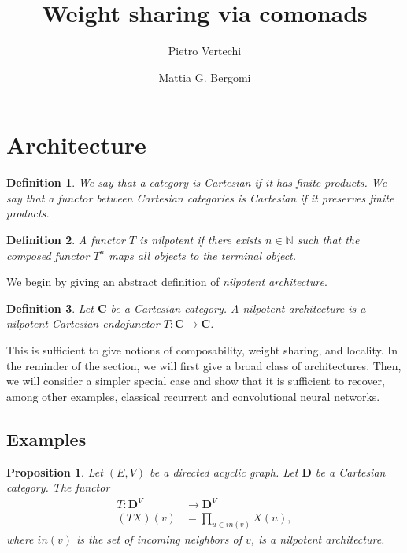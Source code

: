 \documentclass[12pt]{article}
\title{Weight sharing via comonads}
\author{
    Pietro Vertechi \and Mattia G. Bergomi
}
\date{}
\newtheorem{definition}{Definition}
\newtheorem{proposition}{Proposition}
\newcommand{\N}{{\mathbb{N}}}
\newcommand{\Cat}{{\mathbf{C}}}
\newcommand{\DCat}{{\mathbf{D}}}
\begin{document}
\maketitle
\begin{abstract}
\end{abstract}

\section{Architecture}


\begin{definition}\label{def:cartesian_category}
    We say that a category is {\em Cartesian} if it has finite products. We say that a functor between Cartesian categories is Cartesian if it preserves finite products.
\end{definition}

\begin{definition}\label{def:nilpotent_functor}
    A functor $T$ is {\em nilpotent} if there exists $n \in \N$ such that the composed functor $T^n$ maps all objects to the terminal object.
\end{definition}

We begin by giving an abstract definition of {\em nilpotent architecture}.

\begin{definition}\label{def:nilpotent_architecture}
    Let $\Cat$ be a Cartesian category. A {\em nilpotent architecture} is a nilpotent Cartesian endofunctor $T \colon \Cat \rightarrow \Cat$.
\end{definition}

This is sufficient to give notions of composability, weight sharing, and locality. In the reminder of the section, we will first give a broad class of architectures. Then, we will consider a simpler special case and show that it is sufficient to recover, among other examples, classical recurrent and convolutional neural networks.

\subsection{Examples}

\begin{proposition}\label{prop:graph_architecture}
    Let $(E, V)$ be a directed acyclic graph. Let $\DCat$ be a Cartesian category. The functor
    \begin{align*}
        T \colon \DCat^V &\rightarrow \DCat^V \\
        (T X)(v) &= \prod_{u \in in(v)} X(u),  
    \end{align*}
    where $in(v)$ is the set of incoming neighbors of $v$, is a nilpotent architecture.
\end{proposition}
\end{document}
